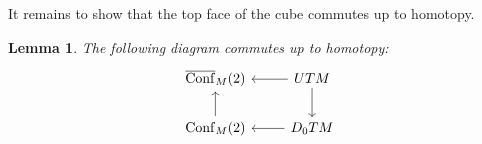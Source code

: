 \documentclass{scrartcl}
\theoremstyle{plain}
\newtheorem{lemma}[theorem]{Lemma}
\theoremstyle{definition}
\DeclareMathOperator{\cofib}{cofib}
\DeclareMathOperator{\Conf}{Conf}
\DeclareMathOperator{\cConf}{\overline{Conf}}
\begin{document}

It remains to show that the top face of the cube commutes up to homotopy. 
\begin{lemma}\label{lem:intersection-product-via-cfg-spc-aid}
    The following diagram commutes up to homotopy:
    \[
        \begin{tikzcd}
            \cConf_M(2) & \lar UTM \dar \\
            \Conf_M(2) \uar & \lar D_0TM
        \end{tikzcd}
    \]
\end{lemma}
\end{document}
